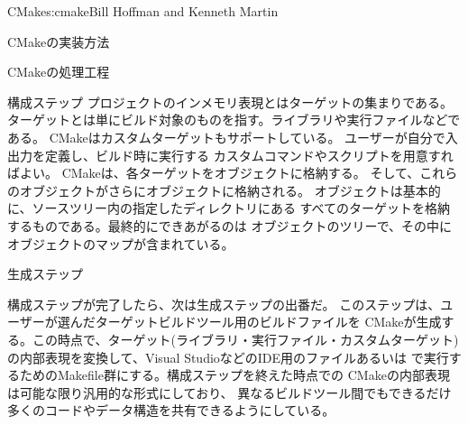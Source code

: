 \begin{aosachapter}{CMake}{s:cmake}{Bill Hoffman and Kenneth Martin}
\begin{aosasect1}{CMakeの実装方法}
\begin{aosasect2}{CMakeの処理工程}
\begin{aosasect3}{構成ステップ}
プロジェクトのインメモリ表現とはターゲットの集まりである。
ターゲットとは単にビルド対象のものを指す。ライブラリや実行ファイルなどである。
CMakeはカスタムターゲットもサポートしている。
ユーザーが自分で入出力を定義し、ビルド時に実行する
カスタムコマンドやスクリプトを用意すればよい。
CMakeは、各ターゲットをオブジェクトに格納する。
そして、これらのオブジェクトがさらにオブジェクトに格納される。
オブジェクトは基本的に、ソースツリー内の指定したディレクトリにある
すべてのターゲットを格納するものである。最終的にできあがるのは
オブジェクトのツリーで、その中に
オブジェクトのマップが含まれている。

\end{aosasect3}

\begin{aosasect3}{生成ステップ}

構成ステップが完了したら、次は生成ステップの出番だ。
このステップは、ユーザーが選んだターゲットビルドツール用のビルドファイルを
CMakeが生成する。この時点で、ターゲット(ライブラリ・実行ファイル・カスタムターゲット)
の内部表現を変換して、Visual StudioなどのIDE用のファイルあるいは
で実行するためのMakefile群にする。構成ステップを終えた時点での
CMakeの内部表現は可能な限り汎用的な形式にしており、
異なるビルドツール間でもできるだけ多くのコードやデータ構造を共有できるようにしている。


\end{aosasect3}
\end{aosasect2}
\end{aosasect1}
\end{aosachapter}
